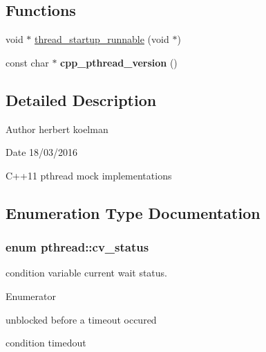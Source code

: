 \subsection*{Functions}
\begin{DoxyCompactItemize}
\item 
void $\ast$ \hyperlink{namespacepthread_a4ca2138b7b0d82d63a05c708edd45a6f}{thread\+\_\+startup\+\_\+runnable} (void $\ast$)
\item 
const char $\ast$ {\bfseries cpp\+\_\+pthread\+\_\+version} ()\hypertarget{namespacepthread_af4184370d6d00fe03b4a0c75c9932a3b}{}\label{namespacepthread_af4184370d6d00fe03b4a0c75c9932a3b}

\end{DoxyCompactItemize}


\subsection{Detailed Description}
\begin{DoxyAuthor}{Author}
herbert koelman 
\end{DoxyAuthor}
\begin{DoxyDate}{Date}
18/03/2016
\end{DoxyDate}
C++11 pthread mock implementations 

\subsection{Enumeration Type Documentation}
\subsubsection[{\texorpdfstring{cv\+\_\+status}{cv_status}}]{\setlength{\rightskip}{0pt plus 5cm}enum {\bf pthread\+::cv\+\_\+status}}\hypertarget{namespacepthread_a823f88a2bf448bd5bd5273b826830bdd}{}\label{namespacepthread_a823f88a2bf448bd5bd5273b826830bdd}
condition variable current wait status. \begin{Desc}
\item[Enumerator]\par
\begin{description}
\item[{\em 
no\+\_\+timeout\hypertarget{namespacepthread_a823f88a2bf448bd5bd5273b826830bdda633b1bc5140f77a22f2c26bea4fa3398}{}\label{namespacepthread_a823f88a2bf448bd5bd5273b826830bdda633b1bc5140f77a22f2c26bea4fa3398}
}]unblocked before a timeout occured \item[{\em 
timedout\hypertarget{namespacepthread_a823f88a2bf448bd5bd5273b826830bdda1c2d3e88a4ad820053c817753867b31a}{}\label{namespacepthread_a823f88a2bf448bd5bd5273b826830bdda1c2d3e88a4ad820053c817753867b31a}
}]condition timedout \end{description}
\end{Desc}
